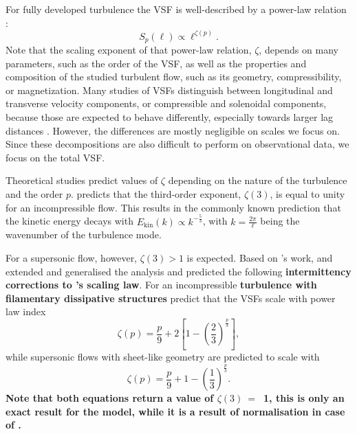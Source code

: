 For fully developed turbulence the VSF is well-described by a power-law relation \citep{Kolmogorov1941,She1994,Boldyrev2002}:
\begin{equation}
	\mathit{S}_p (\ell) \propto \ell^{\zeta(p)}.
	\label{equ:method:propto_zeta}
\end{equation}
Note that the scaling exponent of that power-law relation, $\zeta$, depends on many parameters, such as the order of the VSF, as well as the properties and composition of the studied turbulent flow, such as its geometry, compressibility, or magnetization.
Many studies of VSFs distinguish between longitudinal and transverse velocity components, or compressible and solenoidal components, because those are expected to behave differently, especially towards larger lag distances \citep{Gotoh2002,Schmidt2008,Benzi2010}.
However, the differences are mostly negligible on scales we focus on. 
Since these decompositions are also difficult to perform on observational data, we focus on the total VSF.

Theoretical studies predict values of $\zeta$ depending on the nature of the turbulence and the order $p$.
\citet{Kolmogorov1941} predicts that the third-order exponent, $\zeta(3)$, is equal to unity for an incompressible flow.
This results in the commonly known prediction that the kinetic energy decays with $E_{\mathrm{kin}}(k) \propto k^{-\frac{5}{3}}$, with $k = \frac{2 \pi}{\ell}$ being the wavenumber of the turbulence mode.

For a supersonic flow, however, $\zeta(3) >1$ is expected.
Based on \citeauthor{Kolmogorov1941}'s work, \citet{She1994} and \citet{Boldyrev2002} extended and generalised the analysis and predicted the following \textbf{intermittency corrections to \citeauthor{Kolmogorov1941}'s scaling law}.
For an incompressible \textbf{turbulence with filamentary dissipative structures} \citet{She1994} predict that
the VSFs scale with power law index
\begin{equation}
	\zeta(p) = \frac{p}{9} + 2 \left[ 1 - \left( \frac{2}{3} \right)^{\frac{p}{3}} \right] ,
	\label{equ:method:she}
\end{equation}
while supersonic flows with sheet-like geometry are predicted to scale with \citep{Boldyrev2002}
\begin{equation}
	\zeta(p) = \frac{p}{9} + 1 - \left( \frac{1}{3} \right)^{\frac{p}{3}}.
	\label{equ:method:boldyrev}
\end{equation}
\textbf{\noindent
    Note that both equations return a value of $\zeta(3)~=$~1, this is only an exact result for the \citeauthor{She1994} model, while it is a result of normalisation in case of \citeauthor{Boldyrev2002}. 
}

